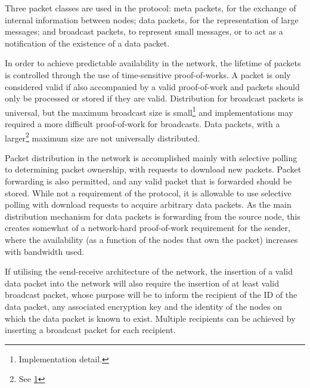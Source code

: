Three packet classes are used in the protocol: meta packets, for the exchange of internal information between nodes; data packets, for the representation of large messages; and broadcast packets, to represent small messages, or to act as a notification of the existence of a data packet.

In order to achieve predictable availability in the network, the lifetime of packets is controlled through the use of time-sensitive proof-of-works. A packet is only considered valid if also accompanied by a valid proof-of-work and packets should only be processed or stored if they are valid. Distribution for broadcast packets is universal, but the maximum broadcast size is small\footnote{\label{fn:imp-detail}Implementation detail.} and implementations may required a more difficult proof-of-work for broadcasts. Data packets, with a larger\footnote{See \ref{fn:imp-detail}} maximum size are not universally distributed.

Packet distribution in the network is accomplished mainly with selective polling to determining packet ownership, with requests to download new packets. Packet forwarding is also permitted, and any valid packet that is forwarded should be stored. While not a requirement of the protocol, it is allowable to use selective polling with download requests to acquire arbitrary data packets. As the main distribution mechanism for data packets is forwarding from the source node, this creates somewhat of a network-hard proof-of-work requirement for the sender, where the availability (as a function of the nodes that own the packet) increases with bandwidth used.

If utilising the send-receive architecture of the network, the insertion of a valid data packet into the network will also require the insertion of at least valid broadcast packet, whose purpose will be to inform the recipient of the ID of the data packet, any associated encryption key and the identity of the nodes on which the data packet is known to exist. Multiple recipients can be achieved by inserting a broadcast packet for each recipient.